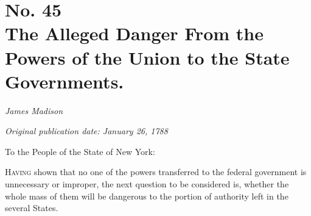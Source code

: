 \chapter[No. 45: The Alleged Danger From the Powers of the Union to the State Governments.]{No. 45\\ {\small The Alleged Danger From the Powers of the Union to the State Governments.}}

\textit{James Madison}

\textit{Original publication date: January 26, 1788}
\vspace{1cm}

To the People of the State of New York:
\vspace{.4cm}

\textsc{Having} shown that no one of the powers transferred to the federal government is unnecessary or improper, the next question to be considered is, whether the whole mass of them will be dangerous to the portion of authority left in the several States.


